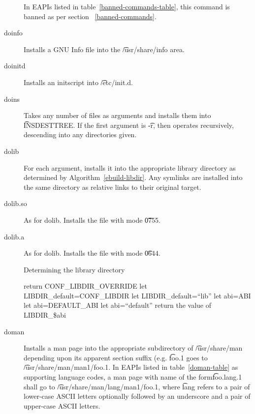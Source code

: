 \begin{description}
\IFKDEBUILDELSE
{
    In EAPIs listed in table~\ref{banned-commands-table}, this command is banned as
    per section ~\ref{banned-commands}.
}{
}

\item[doinfo] Installs a GNU Info file into the \t{/usr/share/info} area.

\item[doinitd] Installs an initscript into \t{/etc/init.d}.

\item[doins] Takes any number of files as arguments and installs them into \t{INSDESTTREE}\@. If
    the first argument is \t{-r}, then operates recursively, descending into any directories given.

\item[dolib] For each argument, installs it into the appropriate library directory as determined by
    Algorithm~\ref{ebuild-libdir}. Any symlinks are installed into the same directory as relative
    links to their original target.

\item[dolib.so] As for dolib. Installs the file with mode \t{0755}.

\item[dolib.a] As for dolib. Installs the file with mode \t{0644}.

\begin{algorithm}
\caption{Determining the library directory} \label{ebuild-libdir}
\begin{algorithmic}[1]
    \STATE return CONF\_LIBDIR\_OVERRIDE
\ENDIF
{}
    \STATE let LIBDIR\_default=CONF\_LIBDIR
\ELSE
    \STATE let LIBDIR\_default=``lib''
\ENDIF
{}
    \STATE let abi=ABI
    \STATE let abi=DEFAULT\_ABI
\ELSE
    \STATE let abi=``default''
\ENDIF
\STATE return the value of LIBDIR\_\$abi
\end{algorithmic}
\end{algorithm}

\item[doman] Installs a man page into the appropriate subdirectory of \t{/usr/share/man} depending
    upon its apparent section suffix (e.g. \t{foo.1} goes to \t{/usr/share/man/man1/foo.1}.
    In EAPIs listed in table~\ref{doman-table} as supporting language codes, a man page with
    name of the form\t{foo.lang.1} shall go to \t{/usr/share/man/lang/man1/foo.1}, where \t{lang}
    refers to a pair of lower-case ASCII letters optionally followed by an underscore and a pair
    of upper-case ASCII letters.


\end{description}
